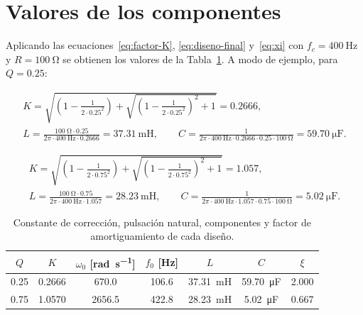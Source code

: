 \section{Valores de los componentes}

Aplicando las ecuaciones~\eqref{eq:factor-K}, \eqref{eq:diseno-final} y~\eqref{eq:xi} con
$f_c = \qty{400}{\hertz}$ y $R = \qty{100}{\ohm}$ se obtienen los valores de la
Tabla~\ref{tab:componentes}. A modo de ejemplo, para $Q = \num{0.25}$:

\begin{gather*}
  K = \sqrt{\left(1 - \frac{1}{2 \cdot \num{0.25}^2}\right)
      + \sqrt{\left(1 - \frac{1}{2 \cdot \num{0.25}^2}\right)^2 + 1}} = \num{0.2666}, \\[4pt]
  L = \frac{\qty{100}{\ohm} \cdot \num{0.25}}{2\pi \cdot \qty{400}{\hertz} \cdot \num{0.2666}}
    = \qty{37.31}{\milli\henry}, \qquad
  C = \frac{1}{2\pi \cdot \qty{400}{\hertz} \cdot \num{0.2666} \cdot \num{0.25} \cdot \qty{100}{\ohm}}
    = \qty{59.70}{\micro\farad}.
\end{gather*}

\begin{gather*}
  K = \sqrt{\left(1 - \frac{1}{2 \cdot \num{0.75}^2}\right)
      + \sqrt{\left(1 - \frac{1}{2 \cdot \num{0.75}^2}\right)^2 + 1}} = \num{1.057}, \\[4pt]
  L = \frac{\qty{100}{\ohm} \cdot \num{0.75}}{2\pi \cdot \qty{400}{\hertz} \cdot \num{1.057}}
    = \qty{28.23}{\milli\henry}, \qquad
  C = \frac{1}{2\pi \cdot \qty{400}{\hertz} \cdot \num{1.057} \cdot \num{0.75} \cdot \qty{100}{\ohm}}
    = \qty{5.02}{\micro\farad}.
\end{gather*}

\begin{table}[H]
  \centering
  \begin{tabular}{|c|c|c|c|c|c|c|}
    \hline
    $Q$ & $K$ & $\omega_0$ [\unit{\radian\per\second}] & $f_0$ [\unit{\hertz}] & $L$ & $C$ & $\xi$ \\
    \hline
    \num{0.25} & \num{0.2666} & \num{670.0}  & \num{106.6} & \qty{37.31}{\milli\henry}
               & \qty{59.70}{\micro\farad} & \num{2.000} \\
    \num{0.75} & \num{1.0570} & \num{2656.5} & \num{422.8} & \qty{28.23}{\milli\henry}
               & \qty{5.02}{\micro\farad}  & \num{0.667} \\
    \hline
  \end{tabular}
  \caption{Constante de corrección, pulsación natural, componentes y factor de amortiguamiento de cada diseño.}
  \label{tab:componentes}
\end{table}

